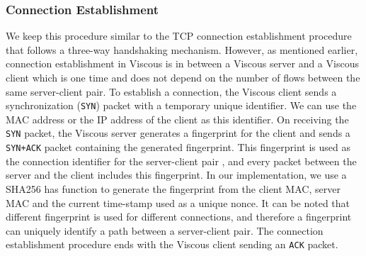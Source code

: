 \subsubsection{Connection Establishment}
We keep this procedure similar to the TCP connection establishment procedure that follows a three-way handshaking mechanism. However, as mentioned earlier, connection establishment in Viscous is in between a Viscous server and a Viscous client which is one time and does not depend on the number of flows between the same server-client pair. To establish a connection, the Viscous client sends a synchronization (\texttt{SYN}) packet with a temporary unique identifier. We can use the MAC address or the IP address of the client as this identifier. On receiving the \texttt{SYN} packet, the Viscous server generates a fingerprint for the client and sends a \texttt{SYN+ACK} packet containing the generated fingerprint. This fingerprint is used as the connection identifier for the server-client pair , and every packet between the server and the client includes this fingerprint. In our implementation, we use a SHA256 has function to generate the fingerprint from the client MAC, server MAC and the current time-stamp used as a unique nonce. It can be noted that different fingerprint is used for different connections, and therefore a fingerprint can uniquely identify a path between a server-client pair.  The connection establishment procedure ends with the Viscous client sending an \texttt{ACK} packet.

%

